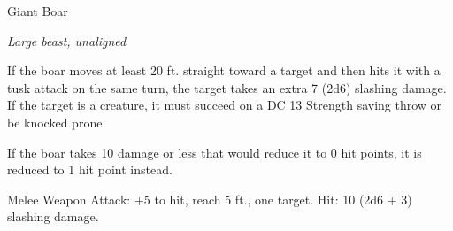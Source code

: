 \begin{monsterbox}{Giant Boar}
\begin{hangingpar}
\textit{Large beast, unaligned}
\end{hangingpar}
\dndline%
\basics[%
armorclass = 12,
hitpoints = 5d10 + 15,
speed = {40 ft.}
]
\dndline%
\stats[%
STR = \stat{17},
DEX = \stat{10},
CON = \stat{16},
INT = \stat{2},
WIS = \stat{7},
CHA = \stat{5}
]
\dndline%
\details[%
skills={},
damageimmunities={},
savingthrows={},
conditionimmunities={},
damageresistances={},
damagevulnerabilities={},
senses={passive Perception 8},
challenge=2
]
\dndline%
\begin{monsteraction}[Charge]
If the boar moves at least 20 ft. straight toward a target and then hits it with a tusk attack on the same turn, the target takes an extra 7 (2d6) slashing damage. If the target is a creature, it must succeed on a DC 13 Strength saving throw or be knocked prone.
\end{monsteraction}
\begin{monsteraction}
If the boar takes 10 damage or less that would reduce it to 0 hit points, it is reduced to 1 hit point instead.
\end{monsteraction}
\begin{monsteraction}[Tusk]
Melee Weapon Attack: +5 to hit, reach 5 ft., one target. Hit: 10 (2d6 + 3) slashing damage.
\end{monsteraction}
\end{monsterbox}
